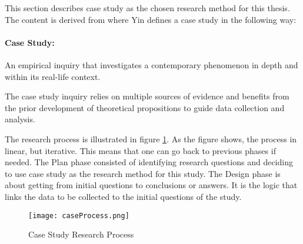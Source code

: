 This section describes case study as the chosen research method for this thesis. The content is derived from \cite{CaseStudyResearch} where Yin defines a case study in the following way:

\paragraph{Case Study:} An empirical inquiry that investigates a contemporary phenomenon in depth and within its real-life context.


The case study inquiry relies on multiple sources of evidence and benefits from the prior development of theoretical propositions to guide data collection and analysis.

The research process is illustrated in figure \ref{fig:caseProcess}. As the figure shows, the process in linear, but iterative. This means that one can go back to previous phases if needed. The Plan phase consisted of identifying research questions and deciding to use case study as the research method for this study. The Design phase is about getting from initial questions to conclusions or answers. It is the logic that links the data to be collected to the initial questions of the study. 

\begin{figure}[h]
\begin{center}
\texttt{[image: caseProcess.png]}
\caption[Case Study Research Process]{Case Study Research Process \cite{CaseStudyResearch}}
\label{fig:caseProcess}
\end{center}
\end{figure}

